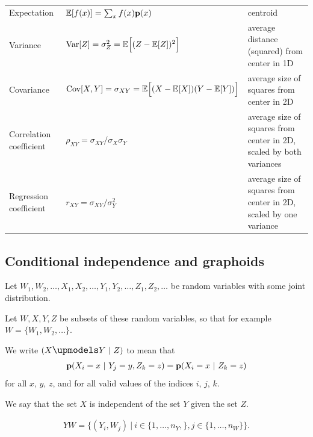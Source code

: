 \begin{tabular}{l l l}
Expectation                  & ${\mathbb E}[f(x)] = \sum_x f(x) \mathbf{p}(x)$                                                & centroid \\
Variance                       & $\text{Var}[Z] = \sigma^2_Z = {\mathbb E}\Big[(Z - {\mathbb E}[Z])^2\Big]$                     & average distance (squared) from center in 1D \\
Covariance                    & $\text{Cov}[X, Y] = \sigma_{XY} = {\mathbb E}\Big[(X - {\mathbb E}[X])(Y - {\mathbb E}[Y])\Big]$   & average size of squares from center in 2D \\
Correlation coefficient     & $\rho_{XY} = \sigma_{XY} / \sigma_X\sigma_Y$                             & average size of squares from center in 2D, scaled by both variances\\
Regression coefficient      & $r_{XY} = \sigma_{XY} / \sigma^2_{Y}$                                      & average size of squares from center in 2D, scaled by one variance
\end{tabular}

\subsection{Conditional independence and graphoids}

Let $W_1, W_2, \ldots, X_1, X_2, \ldots, Y_1, Y_2, \ldots, Z_1, Z_2, \ldots$ be random variables with some
joint distribution.

Let $W, X, Y, Z$ be subsets of these random variables, so that for example $W = \{W_1, W_2, \ldots \}$.

\begin{definition}
  We write $(X \indep Y ~|~ Z)$ to mean that
\begin{align*}
  \mathbf{p}(X_i=x ~|~ Y_j=y, Z_k=z) = \mathbf{p}(X_i=x ~|~ Z_k=z)
\end{align*}
for all $x$, $y$, $z$, and for all valid values of the indices $i$, $j$, $k$.

We say that the set $X$ is independent of the set $Y$ given the set $Z$.
\end{definition}

\begin{definition}[Product]
  \begin{align*}
    YW = \Big\{(Y_i, W_j) ~\Big|~ i \in \{1, \ldots, n_Y,\}, j \in \{1, \ldots, n_W\}\Big\}.
  \end{align*}
\end{definition}

